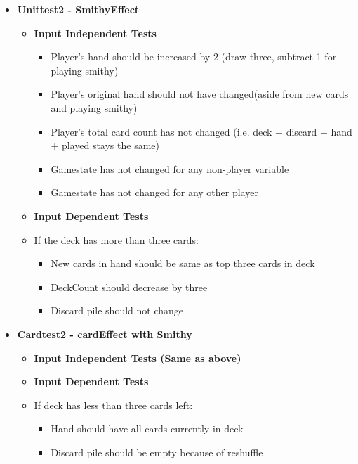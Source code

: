 \documentclass[11pt,letterpaper]{article}
\begin{document}
\begin{enumerate}[label=\Roman*.]
\begin{itemize}[leftmargin=*]
      \item \textbf{Unittest2 - SmithyEffect}

        \begin{itemize}[leftmargin=*, label={}]
          \item \textbf{Input Independent Tests}

            \begin{itemize}[leftmargin=*]
              \item Player's hand should be increased by 2 (draw three, subtract 1 for playing smithy)
              \item Player's original hand should not have changed(aside from new cards and playing smithy)
              \item Player's total card count has not changed (i.e. deck + discard + hand + played stays the same)
              \item Gamestate has not changed for any non-player variable
              \item Gamestate has not changed for any other player
            \end{itemize}

          \item \textbf{Input Dependent Tests}
          \item If the deck has more than three cards: 
            \begin{itemize}[leftmargin=*]
              \item New cards in hand should be same as top three cards in deck
              \item DeckCount should decrease by three
              \item Discard pile should not change
            \end{itemize}
        \end{itemize}

      \item \textbf{Cardtest2 - cardEffect with Smithy}
        \begin{itemize}[leftmargin=*, label={}]
          \item \textbf{Input Independent Tests (Same as above)}
          \item \textbf{Input Dependent Tests}
          \item If deck has less than three cards left: 
            \begin{itemize}[leftmargin=*]
              \item Hand should have all cards currently in deck
              \item Discard pile should be empty because of reshuffle
            \end{itemize}
        \end{itemize}


\end{itemize}
\end{enumerate}
\end{document}

